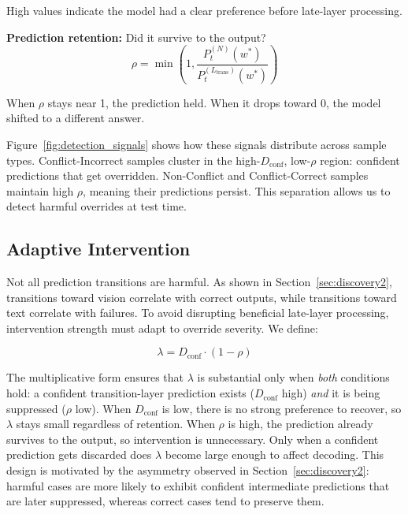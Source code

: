 High values indicate the model had a clear preference before late-layer processing.

\textbf{Prediction retention:} Did it survive to the output?
\begin{equation}
\rho = \min\left(1, \frac{P^{(N)}_t(w^*)}{P^{(L_{\text{trans}})}_t(w^*)}\right)
\end{equation}

When $\rho$ stays near 1, the prediction held. When it drops toward 0, the model shifted to a different answer.

Figure~\ref{fig:detection_signals} shows how these signals distribute across sample types. Conflict-Incorrect samples cluster in the high-$D_{\text{conf}}$, low-$\rho$ region: confident predictions that get overridden. Non-Conflict and Conflict-Correct samples maintain high $\rho$, meaning their predictions persist. This separation allows us to detect harmful overrides at test time.


\subsection{Adaptive Intervention}

Not all prediction transitions are harmful. As shown in Section~\ref{sec:discovery2}, transitions toward vision correlate with correct outputs, while transitions toward text correlate with failures. To avoid disrupting beneficial late-layer processing, intervention strength must adapt to override severity. We define:

\begin{equation}
\lambda = D_{\text{conf}} \cdot (1 - \rho)
\label{eq:lambda}
\end{equation}


The multiplicative form ensures that $\lambda$ is substantial only when \emph{both} conditions hold: a confident transition-layer prediction exists ($D_{\text{conf}}$ high) \emph{and} it is being suppressed ($\rho$ low). When $D_{\text{conf}}$ is low, there is no strong preference to recover, so $\lambda$ stays small regardless of retention. When $\rho$ is high, the prediction already survives to the output, so intervention is unnecessary. Only when a confident prediction gets discarded does $\lambda$ become large enough to affect decoding. This design is motivated by the asymmetry observed in Section~\ref{sec:discovery2}: harmful cases are more likely to exhibit confident intermediate predictions that are later suppressed, whereas correct cases tend to preserve them.

